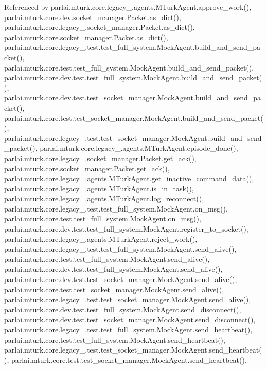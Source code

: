 Referenced by parlai.\+mturk.\+core.\+legacy\+\_.\+agents.\+M\+Turk\+Agent.\+approve\+\_\+work(), parlai.\+mturk.\+core.\+dev.\+socket\+\_\+manager.\+Packet.\+as\+\_\+dict(), parlai.\+mturk.\+core.\+legacy\+\_.\+socket\+\_\+manager.\+Packet.\+as\+\_\+dict(), parlai.\+mturk.\+core.\+socket\+\_\+manager.\+Packet.\+as\+\_\+dict(), parlai.\+mturk.\+core.\+legacy\+\_.\+test.\+test\+\_\+full\+\_\+system.\+Mock\+Agent.\+build\+\_\+and\+\_\+send\+\_\+packet(), parlai.\+mturk.\+core.\+test.\+test\+\_\+full\+\_\+system.\+Mock\+Agent.\+build\+\_\+and\+\_\+send\+\_\+packet(), parlai.\+mturk.\+core.\+dev.\+test.\+test\+\_\+full\+\_\+system.\+Mock\+Agent.\+build\+\_\+and\+\_\+send\+\_\+packet(), parlai.\+mturk.\+core.\+dev.\+test.\+test\+\_\+socket\+\_\+manager.\+Mock\+Agent.\+build\+\_\+and\+\_\+send\+\_\+packet(), parlai.\+mturk.\+core.\+test.\+test\+\_\+socket\+\_\+manager.\+Mock\+Agent.\+build\+\_\+and\+\_\+send\+\_\+packet(), parlai.\+mturk.\+core.\+legacy\+\_.\+test.\+test\+\_\+socket\+\_\+manager.\+Mock\+Agent.\+build\+\_\+and\+\_\+send\+\_\+packet(), parlai.\+mturk.\+core.\+legacy\+\_.\+agents.\+M\+Turk\+Agent.\+episode\+\_\+done(), parlai.\+mturk.\+core.\+legacy\+\_.\+socket\+\_\+manager.\+Packet.\+get\+\_\+ack(), parlai.\+mturk.\+core.\+socket\+\_\+manager.\+Packet.\+get\+\_\+ack(), parlai.\+mturk.\+core.\+legacy\+\_.\+agents.\+M\+Turk\+Agent.\+get\+\_\+inactive\+\_\+command\+\_\+data(), parlai.\+mturk.\+core.\+legacy\+\_.\+agents.\+M\+Turk\+Agent.\+is\+\_\+in\+\_\+task(), parlai.\+mturk.\+core.\+legacy\+\_.\+agents.\+M\+Turk\+Agent.\+log\+\_\+reconnect(), parlai.\+mturk.\+core.\+legacy\+\_.\+test.\+test\+\_\+full\+\_\+system.\+Mock\+Agent.\+on\+\_\+msg(), parlai.\+mturk.\+core.\+test.\+test\+\_\+full\+\_\+system.\+Mock\+Agent.\+on\+\_\+msg(), parlai.\+mturk.\+core.\+dev.\+test.\+test\+\_\+full\+\_\+system.\+Mock\+Agent.\+register\+\_\+to\+\_\+socket(), parlai.\+mturk.\+core.\+legacy\+\_.\+agents.\+M\+Turk\+Agent.\+reject\+\_\+work(), parlai.\+mturk.\+core.\+legacy\+\_.\+test.\+test\+\_\+full\+\_\+system.\+Mock\+Agent.\+send\+\_\+alive(), parlai.\+mturk.\+core.\+test.\+test\+\_\+full\+\_\+system.\+Mock\+Agent.\+send\+\_\+alive(), parlai.\+mturk.\+core.\+dev.\+test.\+test\+\_\+full\+\_\+system.\+Mock\+Agent.\+send\+\_\+alive(), parlai.\+mturk.\+core.\+dev.\+test.\+test\+\_\+socket\+\_\+manager.\+Mock\+Agent.\+send\+\_\+alive(), parlai.\+mturk.\+core.\+test.\+test\+\_\+socket\+\_\+manager.\+Mock\+Agent.\+send\+\_\+alive(), parlai.\+mturk.\+core.\+legacy\+\_.\+test.\+test\+\_\+socket\+\_\+manager.\+Mock\+Agent.\+send\+\_\+alive(), parlai.\+mturk.\+core.\+dev.\+test.\+test\+\_\+full\+\_\+system.\+Mock\+Agent.\+send\+\_\+disconnect(), parlai.\+mturk.\+core.\+dev.\+test.\+test\+\_\+socket\+\_\+manager.\+Mock\+Agent.\+send\+\_\+disconnect(), parlai.\+mturk.\+core.\+legacy\+\_.\+test.\+test\+\_\+full\+\_\+system.\+Mock\+Agent.\+send\+\_\+heartbeat(), parlai.\+mturk.\+core.\+test.\+test\+\_\+full\+\_\+system.\+Mock\+Agent.\+send\+\_\+heartbeat(), parlai.\+mturk.\+core.\+legacy\+\_.\+test.\+test\+\_\+socket\+\_\+manager.\+Mock\+Agent.\+send\+\_\+heartbeat(), parlai.\+mturk.\+core.\+test.\+test\+\_\+socket\+\_\+manager.\+Mock\+Agent.\+send\+\_\+heartbeat(), 